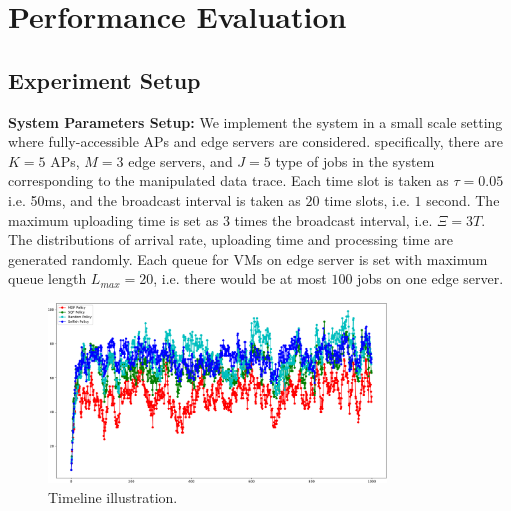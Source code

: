 \section{Performance Evaluation}
\label{sec:evaluation}

\subsection{Experiment Setup}
\textbf{System Parameters Setup:}
We implement the system in a small scale setting where fully-accessible APs and edge servers are considered.
specifically, there are $K=5$ APs, $M=3$ edge servers, and $J=5$ type of jobs in the system corresponding to the manipulated data trace.
Each time slot is taken as $\tau = 0.05$ i.e. 50ms, and the broadcast interval is taken as $20$ time slots, i.e. $1$ second.
The maximum uploading time is set as $3$ times the broadcast interval, i.e. $\Xi = 3T$.
The distributions of arrival rate, uploading time and processing time are generated randomly.
Each queue for VMs on edge server is set with maximum queue length $L_{max}=20$, i.e. there would be at most $100$ jobs on one edge server.

\begin{figure}[ht!]
    \centering
    \includegraphics[width=0.80\textwidth]{images/Figure_1.pdf}
    \caption{Timeline illustration.}
    \label{fig:general_timeline}
\end{figure}

